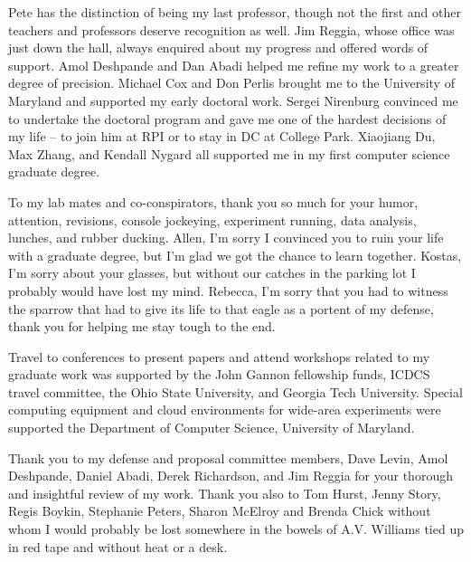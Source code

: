 Pete has the distinction of being my last professor, though not the first and other teachers and professors deserve recognition as well. Jim Reggia, whose office was just down the hall, always enquired about my progress and offered words of support. Amol Deshpande and Dan Abadi helped me refine my work to a greater degree of precision. Michael Cox and Don Perlis brought me to the University of Maryland and supported my early doctoral work. Sergei Nirenburg convinced me to undertake the doctoral program and gave me one of the hardest decisions of my life -- to join him at RPI or to stay in DC at College Park. Xiaojiang Du, Max Zhang, and Kendall Nygard all supported me in my first computer science graduate degree.

To my lab mates and co-conspirators, thank you so much for your humor, attention, revisions, console jockeying, experiment running, data analysis, lunches, and rubber ducking. Allen, I'm sorry I convinced you to ruin your life with a graduate degree, but I'm glad we got the chance to learn together. Kostas, I'm sorry about your glasses, but without our catches in the parking lot I probably would have lost my mind. Rebecca, I'm sorry that you had to witness the sparrow that had to give its life to that eagle as a portent of my defense, thank you for helping me stay tough to the end.

Travel to conferences to present papers and attend workshops related to my graduate work was supported by the John Gannon fellowship funds, ICDCS travel committee, the Ohio State University, and Georgia Tech University. Special computing equipment and cloud environments for wide-area experiments were supported the Department of Computer Science, University of Maryland.

Thank you to my defense and proposal committee members, Dave Levin, Amol Deshpande, Daniel Abadi, Derek Richardson, and Jim Reggia for your thorough and insightful review of my work. Thank you also to Tom Hurst, Jenny Story, Regis Boykin, Stephanie Peters, Sharon McElroy and Brenda Chick without whom I would probably be lost somewhere in the bowels of A.V. Williams tied up in red tape and without heat or a desk.

